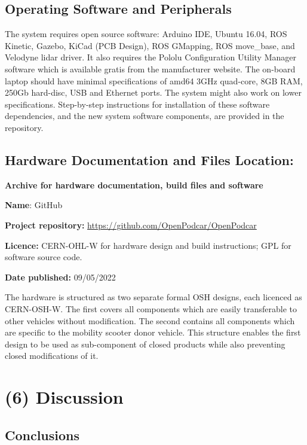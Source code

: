 \documentclass[a4paper]{article}
\begin{document}
	\subsection{Operating Software and Peripherals}\label{h.uz77dixfh5i4}
	
	The system requires open source software: Arduino IDE, Ubuntu 16.04, ROS Kinetic, Gazebo, KiCad (PCB Design), ROS GMapping, ROS move\_base, and Velodyne lidar driver. It also requires the Pololu Configuration Utility Manager software which is available gratis from the manufacturer website. The on-board laptop should have minimal specifications of amd64 3GHz quad-core, 8GB RAM, 250Gb hard-disc, USB and Ethernet ports. The system might also work on lower specifications. Step-by-step instructions for installation of these software dependencies, and the new system software components, are provided in the repository.
	
	\subsection{Hardware Documentation and Files Location:}\label{h.nbisrsde6sc3}
	
	\textbf{Archive for hardware documentation, build files and software}
	
	\textbf{Name}: GitHub
	
	
	\textbf{Project repository:} \url{https://github.com/OpenPodcar/OpenPodcar}
	
	\textbf{Licence:} CERN-OHL-W for hardware design and build instructions; GPL for software source code.
	
	\textbf{Date published:} 09/05/2022
	
	The hardware is structured as two separate formal OSH designs, each licenced as CERN-OSH-W. The first covers all components which are easily transferable to other vehicles without modification. The second contains all components which are specific to the mobility scooter donor vehicle. This structure enables the first design to be used as sub-component of closed products while also preventing closed modifications of it.
	
	
	\section{(6) Discussion}\label{h.90jl7wm65t65}
	
	\subsection{Conclusions}\label{h.h3fr33ylzsnh}
	
\end{document}
